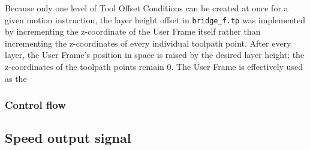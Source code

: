 Because only one level of Tool Offset Conditions can be created at once for a given motion instruction, the layer height offset in \verb|bridge_f.tp| was implemented by incrementing the z-coordinate of the User Frame itself rather than incrementing the z-coordinates of every individual toolpath point. After every layer, the User Frame's position in space is raised by the desired layer height; the z-coordinates of the toolpath points remain 0. The User Frame is effectively used as the 

\subsubsection{Control flow}

\subsection{Speed output signal}

